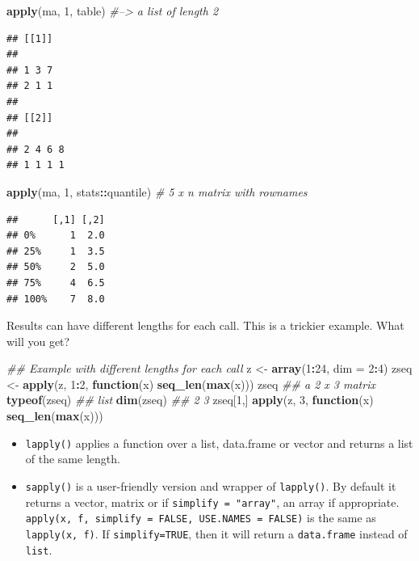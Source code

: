 \documentclass[12pt,]{krantz}
\makeatletter
\newenvironment{Shaded}{\begin{snugshade}}{\end{snugshade}}
\newcommand{\CommentTok}[1]{\textcolor[rgb]{0.37,0.37,0.37}{\textit{#1}}}
\newcommand{\ControlFlowTok}[1]{\textcolor[rgb]{0.27,0.27,0.27}{\textbf{#1}}}
\newcommand{\DataTypeTok}[1]{\textcolor[rgb]{0.27,0.27,0.27}{#1}}
\newcommand{\DecValTok}[1]{\textcolor[rgb]{0.06,0.06,0.06}{#1}}
\newcommand{\KeywordTok}[1]{\textcolor[rgb]{0.27,0.27,0.27}{\textbf{#1}}}
\newcommand{\NormalTok}[1]{#1}
\newcommand{\OperatorTok}[1]{\textcolor[rgb]{0.43,0.43,0.43}{\textbf{#1}}}
\newcommand{\StringTok}[1]{\textcolor[rgb]{0.5,0.5,0.5}{#1}}
\providecommand{\tightlist}{%
  \setlength{\itemsep}{0pt}\setlength{\parskip}{0pt}}
\newenvironment{kframe}{%
\medskip{}
\setlength{\fboxsep}{.8em}
 \def\at@end@of@kframe{}%
 \ifinner\ifhmode%
  \def\at@end@of@kframe{\end{minipage}}%
  \begin{minipage}{\columnwidth}%
 \fi\fi%
 \def\FrameCommand##1{\hskip\@totalleftmargin \hskip-\fboxsep
 \colorbox{shadecolor}{##1}\hskip-\fboxsep
     \hskip-\linewidth \hskip-\@totalleftmargin \hskip\columnwidth}%
 \MakeFramed {\advance\hsize-\width
   \@totalleftmargin\z@ \linewidth\hsize
   \@setminipage}}%
 {\par\unskip\endMakeFramed%
 \at@end@of@kframe}
\renewenvironment{Shaded}{\begin{kframe}}{\end{kframe}}
\makeatother
\begin{document}
\begin{Shaded}
\begin{Highlighting}[]
\KeywordTok{apply}\NormalTok{(ma, }\DecValTok{1}\NormalTok{, table)  }\CommentTok{#--> a list of length 2}
\end{Highlighting}
\end{Shaded}

\begin{verbatim}
## [[1]]
## 
## 1 3 7 
## 2 1 1 
## 
## [[2]]
## 
## 2 4 6 8 
## 1 1 1 1
\end{verbatim}

\begin{Shaded}
\begin{Highlighting}[]
\KeywordTok{apply}\NormalTok{(ma, }\DecValTok{1}\NormalTok{, stats}\OperatorTok{::}\NormalTok{quantile) }\CommentTok{# 5 x n matrix with rownames}
\end{Highlighting}
\end{Shaded}

\begin{verbatim}
##      [,1] [,2]
## 0%      1  2.0
## 25%     1  3.5
## 50%     2  5.0
## 75%     4  6.5
## 100%    7  8.0
\end{verbatim}

Results can have different lengths for each call. This is a trickier example. What will you get?

\begin{Shaded}
\begin{Highlighting}[]
\CommentTok{## Example with different lengths for each call}
\NormalTok{z <-}\StringTok{ }\KeywordTok{array}\NormalTok{(}\DecValTok{1}\OperatorTok{:}\DecValTok{24}\NormalTok{, }\DataTypeTok{dim =} \DecValTok{2}\OperatorTok{:}\DecValTok{4}\NormalTok{)}
\NormalTok{zseq <-}\StringTok{ }\KeywordTok{apply}\NormalTok{(z, }\DecValTok{1}\OperatorTok{:}\DecValTok{2}\NormalTok{, }\ControlFlowTok{function}\NormalTok{(x) }\KeywordTok{seq_len}\NormalTok{(}\KeywordTok{max}\NormalTok{(x)))}
\NormalTok{zseq         }\CommentTok{## a 2 x 3 matrix}
\KeywordTok{typeof}\NormalTok{(zseq) }\CommentTok{## list}
\KeywordTok{dim}\NormalTok{(zseq) }\CommentTok{## 2 3}
\NormalTok{zseq[}\DecValTok{1}\NormalTok{,]}
\KeywordTok{apply}\NormalTok{(z, }\DecValTok{3}\NormalTok{, }\ControlFlowTok{function}\NormalTok{(x) }\KeywordTok{seq_len}\NormalTok{(}\KeywordTok{max}\NormalTok{(x)))}
\end{Highlighting}
\end{Shaded}

\begin{itemize}
\tightlist
\item
  \texttt{lapply()} applies a function over a list, data.frame or vector and returns a list of the same length.
\item
  \texttt{sapply()} is a user-friendly version and wrapper of \texttt{lapply()}. By default it returns a vector, matrix or if \texttt{simplify\ =\ "array"}, an array if appropriate. \texttt{apply(x,\ f,\ simplify\ =\ FALSE,\ USE.NAMES\ =\ FALSE)} is the same as \texttt{lapply(x,\ f)}. If \texttt{simplify=TRUE}, then it will return a \texttt{data.frame} instead of \texttt{list}.
\end{itemize}
\end{document}
